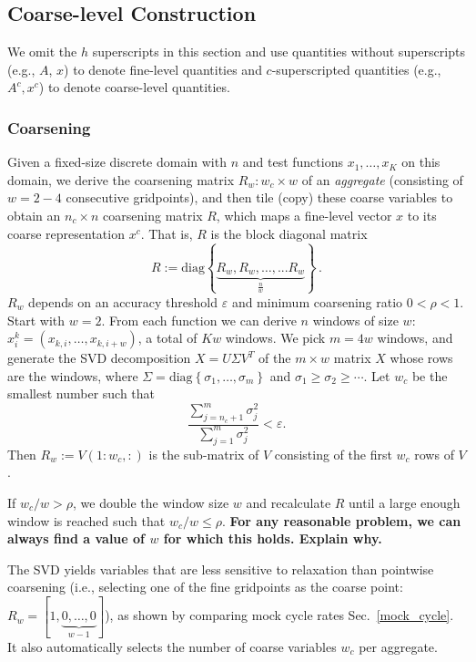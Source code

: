 \documentclass{article}
\begin{document}
\subsection{Coarse-level Construction}
We omit the $h$ superscripts in this section and use quantities without superscripts (e.g., $A$, $x$) to denote fine-level quantities and $c$-superscripted quantities (e.g., $A^c, x^c$) to denote coarse-level quantities.

\subsubsection{Coarsening}
Given a fixed-size discrete domain with $n$ and test functions $x_1,\dots,x_K$ on this domain, we derive the coarsening matrix $R_w: w_c \times w$ of an \emph{aggregate} (consisting of $w = 2-4$ consecutive gridpoints), and then tile (copy) these coarse variables to obtain an $n_c \times n$ coarsening matrix $R$, which maps a fine-level vector $x$ to its coarse representation $x^c$. That is, $R$ is the block diagonal matrix
\begin{equation}
	R := \text{diag} \left\{ \underbrace{R_w, R_w, \dots, ... R_w }_{\frac{n}{w}}  \right\} \,.
\end{equation}
$R_w$ depends on an accuracy threshold $\varepsilon$ and minimum coarsening ratio $0 < \rho < 1$. Start with $w = 2$. From each function we can derive $n$ windows of size $w$: $x^k_i = (x_{k,i},\dots,x_{k,i+w})$, a total of $Kw$ windows. We pick $m = 4 w$ windows, and generate the SVD decomposition $X = U \Sigma V^T$ of the $m \times w$ matrix $X$ whose rows are the windows, where $\Sigma = \text{diag}\left\{\sigma_1, \dots, \sigma_m \right\}$ and $\sigma_1 \geq \sigma_2 \geq \cdots$. Let $w_c$ be the smallest number such that
\begin{equation}
	\frac{\sum_{j=n_c+1}^m \sigma_j^2}{\sum_{j=1}^m \sigma_j^2 } < \varepsilon.
\end{equation}
Then $R_w := V(1:w_c,:)$ is the sub-matrix of $V$ consisting of the first $w_c$ rows of $V$.

If $w_c/w > \rho$, we double the window size $w$ and recalculate $R$ until a large enough window is reached such that $w_c/w \leq \rho$. \textbf{For any reasonable problem, we can always find a value of $w$ for which this holds. Explain why.}

The SVD yields variables that are less sensitive to relaxation than pointwise coarsening (i.e., selecting one of the fine gridpoints as the coarse point: $R_w = [1,\underbrace{0,\dots,0}_{w-1}]$), as shown by comparing mock cycle rates Sec.~\ref{mock_cycle}. It also automatically selects the number of coarse variables $w_c$ per aggregate.
\end{document}
